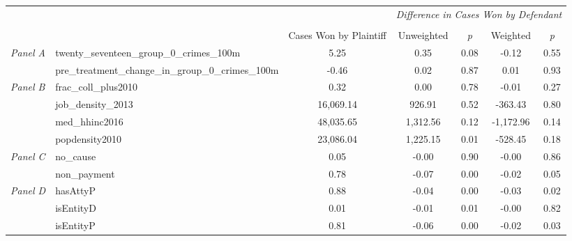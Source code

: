 \begin{tabular}{llccccc}
\toprule
 &  & \textit{} & \multicolumn{4}{c}{\textit{Difference in Cases Won by Defendant}} \\
\cline{4-7}
\\
 &  & Cases Won by Plaintiff & Unweighted & \emph{p} & Weighted & \emph{p} \\
\midrule
\multirow[c]{2}{3cm}{\textit{Panel A}} & twenty_seventeen_group_0_crimes_100m & 5.25 & 0.35 & 0.08 & -0.12 & 0.55 \\
 & pre_treatment_change_in_group_0_crimes_100m & -0.46 & 0.02 & 0.87 & 0.01 & 0.93 \\
\cline{1-7}
\multirow[c]{4}{3cm}{\textit{Panel B}} & frac_coll_plus2010 & 0.32 & 0.00 & 0.78 & -0.01 & 0.27 \\
 & job_density_2013 & 16,069.14 & 926.91 & 0.52 & -363.43 & 0.80 \\
 & med_hhinc2016 & 48,035.65 & 1,312.56 & 0.12 & -1,172.96 & 0.14 \\
 & popdensity2010 & 23,086.04 & 1,225.15 & 0.01 & -528.45 & 0.18 \\
\cline{1-7}
\multirow[c]{2}{3cm}{\textit{Panel C}} & no_cause & 0.05 & -0.00 & 0.90 & -0.00 & 0.86 \\
 & non_payment & 0.78 & -0.07 & 0.00 & -0.02 & 0.05 \\
\cline{1-7}
\multirow[c]{3}{3cm}{\textit{Panel D}} & hasAttyP & 0.88 & -0.04 & 0.00 & -0.03 & 0.02 \\
 & isEntityD & 0.01 & -0.01 & 0.01 & -0.00 & 0.82 \\
 & isEntityP & 0.81 & -0.06 & 0.00 & -0.02 & 0.03 \\
\cline{1-7}
\bottomrule
\end{tabular}
